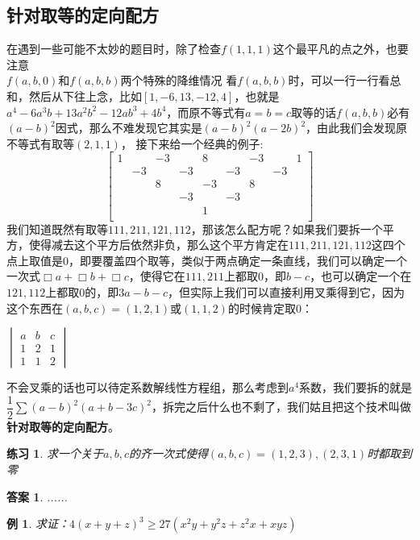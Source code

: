 \documentclass[UTF8]{ctexart}
\newtheorem{1}{例}
\newtheorem{3}{练习}
\newtheorem{4}{答案}
\begin{document}
\subsection{针对取等的定向配方}
在遇到一些可能不太妙的题目时，除了检查$ f(1,1,1) $这个最平凡的点之外，也要注意\\$ f(a,b,0) $和$ f(a,b,b) $两个特殊的降维情况
看$ f(a,b,b) $时，可以一行一行看总和，然后从下往上念，比如$ [1, -6, 13, -12, 4] $，也就是$ a^{4}-6a^{3}b+13a^{2}b^{2}-12ab^{3}+4b^{4} $，而原不等式有$ a=b=c $取等的话$ f(a,b,b) $必有$ (a-b)^{2} $因式，那么不难发现它其实是$ (a-b)^{2}(a-2b)^{2} $，由此我们会发现原不等式有取等$ (2,1,1) $，
接下来给一个经典的例子:
\renewcommand*{\arraystretch}{1.732}\[
\left[\begin{matrix}
	1& &-3& &8& &-3& &1\\
	&-3& &-3& &-3& &-3&\\
	& &8& &-3& &8& &\\
	& & &-3& &-3& & &\\
	& & & &1& & & &\\
\end{matrix}\right]
\]
我们知道既然有取等$ 111,211,121,112 $，那该怎么配方呢？如果我们要拆一个平方，使得减去这个平方后依然非负，那么这个平方肯定在$ 111,211,121,112 $这四个点上取值是$ 0 $，即要覆盖四个取等，类似于两点确定一条直线，我们可以确定一个一次式$ \Box a+\Box b+\Box c $，使得它在$ 111,211 $上都取$ 0 $，即$ b-c $，也可以确定一个在$ 121,112 $上都取$ 0 $的，即$ 3a-b-c $，但实际上我们可以直接利用叉乘得到它，因为这个东西在$ (a,b,c)=(1,2,1) $或$ (1,1,2) $的时候肯定取$ 0 $：
\begin{center}
	$ \begin{vmatrix}
		a& b & c\\
		1& 2 & 1\\
		1& 1 & 2
	\end{vmatrix} $
\end{center}
不会叉乘的话也可以待定系数解线性方程组，那么考虑到$ a^{4} $系数，我们要拆的就是$\dfrac{1}{2} \displaystyle \sum (a-b)^{2}(a+b-3c)^{2} $，拆完之后什么也不剩了，我们姑且把这个技术叫做\textbf{针对取等的定向配方}。\\
\begin{3}
	求一个关于$ a,b,c $的齐一次式使得$ (a,b,c)=(1,2,3),(2,3,1) $时都取到零
\end{3}
\begin{4}
	......
\end{4}
\begin{1}
	求证：$ 4(x+y+z)^{3}\ge 27(x^{2}y+y^{2}z+z^{2}x+xyz) $
\end{1}
\end{document}

